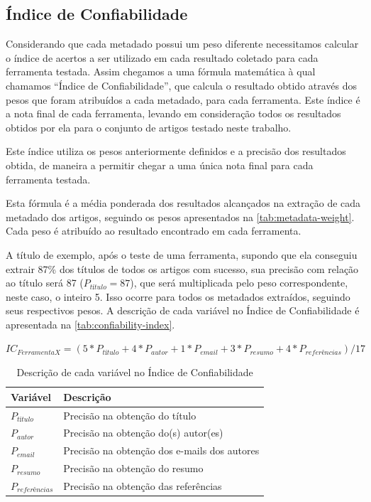 \subsection{Índice de Confiabilidade}
\label{ssec:confiability-index}


Considerando que cada metadado possui um peso diferente necessitamos calcular o índice de acertos a ser utilizado em cada resultado coletado para cada ferramenta testada. Assim chegamos a uma fórmula matemática à qual chamamos ``Índice de Confiabilidade'', que calcula o resultado obtido através dos pesos que foram atribuídos a cada metadado, para cada ferramenta. Este índice é a nota final de cada ferramenta, levando em consideração todos os resultados obtidos por ela para o conjunto de artigos testado neste trabalho.

Este índice utiliza os pesos anteriormente definidos e a precisão dos resultados obtida, de maneira a permitir chegar a uma única nota final para cada ferramenta testada.

Esta fórmula é a média ponderada dos resultados alcançados na extração de cada metadado dos artigos, seguindo os pesos apresentados na \autoref{tab:metadata-weight}. Cada peso é atribuído ao resultado encontrado em cada ferramenta. 

A título de exemplo, após o teste de uma ferramenta, supondo que ela conseguiu extrair 87\% dos títulos de todos os artigos com sucesso, sua precisão com relação ao título será 87 ($P_{título}=87$), que será multiplicada pelo peso correspondente, neste caso, o inteiro 5. Isso ocorre para todos os metadados extraídos, seguindo seus respectivos pesos. A descrição de cada variável no Índice de Confiabilidade é apresentada na \autoref{tab:confiability-index}.

\begin{center}
    $ IC_{Ferramenta X}=(5*P_{título}+4*P_{autor}+1*P_{email}+3*P_{resumo}+4*P_{referências}) / 17 $
\end{center}

\begin{table}
    \caption{Descrição de cada variável no Índice de Confiabilidade}
    \begin{center}
        \begin{tabular}{|p{3cm}|p{8cm}|}
            \hline \textbf{Variável} & \textbf{Descrição}\\ 
            \hline $P_{título}$ & Precisão na obtenção do título \\
            \hline $P_{autor}$ & Precisão na obtenção do(s) autor(es)\\
            \hline $P_{email}$ & Precisão na obtenção dos e-mails dos autores \\
            \hline $P_{resumo}$ & Precisão na obtenção do resumo \\
            \hline $P_{referências}$ & Precisão na obtenção das referências \\
            \hline 
        \end{tabular} 
    \end{center}
    \label{tab:confiability-index}
\end{table}

